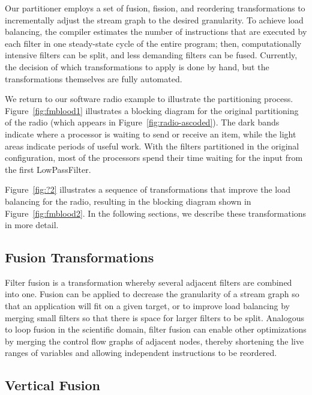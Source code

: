 Our partitioner employs a set of fusion, fission, and reordering
transformations to incrementally adjust the stream graph to the
desired granularity.  To achieve load balancing, the compiler
estimates the number of instructions that are executed by each filter
in one steady-state cycle of the entire program; then, computationally
intensive filters can be split, and less demanding filters can be
fused.  Currently, the decision of which transformations to apply is
done by hand, but the transformations themselves are fully automated.

We return to our software radio example to illustrate the partitioning
process.  Figure~\ref{fig:fmblood1} illustrates a blocking diagram for
the original partitioning of the radio (which appears in
Figure~\ref{fig:radio-ascoded}).  The dark bands indicate where a processor is
waiting to send or receive an item, while the light areas indicate
periods of useful work.  With the filters partitioned in the original
configuration, most of the processors spend their time waiting for the
input from the first LowPassFilter.

Figure~\ref{fig:?2} illustrates a sequence of transformations that
improve the load balancing for the radio, resulting in the blocking
diagram shown in Figure~\ref{fig:fmblood2}.   In the following sections, we describe these
transformations in more detail.


\subsection{Fusion Transformations}

Filter fusion is a transformation whereby several adjacent filters are
combined into one.  Fusion can be applied to decrease the granularity
of a stream graph so that an application will fit on a given target,
or to improve load balancing by merging small filters so that there is
space for larger filters to be split.  Analogous to loop fusion in the
scientific domain, filter fusion can enable other optimizations by
merging the control flow graphs of adjacent nodes, thereby shortening
the live ranges of variables and allowing independent instructions to
be reordered.

\subsection{Vertical Fusion}

